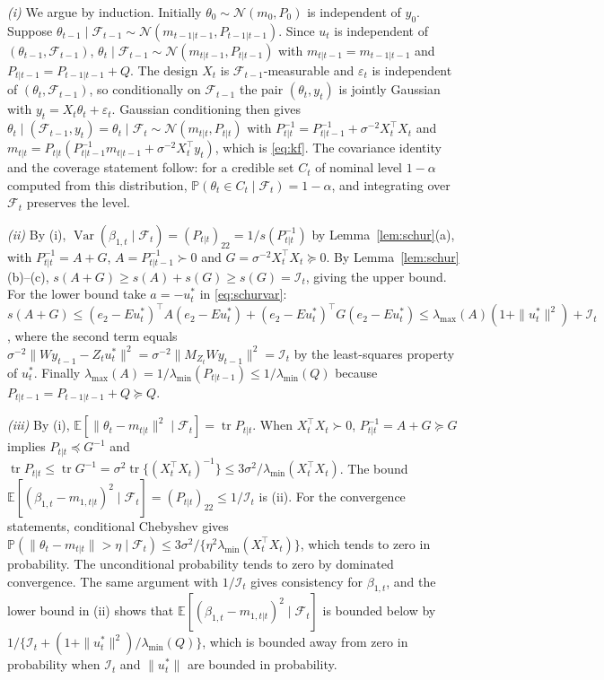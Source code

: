 \documentclass[12pt]{article}
\theoremstyle{plain}
\theoremstyle{definition}
\theoremstyle{remark}
\newcommand{\E}{\mathbb{E}}
\newcommand{\Prob}{\mathbb{P}}
\newcommand{\Var}{\operatorname{Var}}
\newcommand{\tr}{\operatorname{tr}}
\newcommand{\calF}{\mathcal{F}}
\newcommand{\calI}{\mathcal{I}}
\newcommand{\calN}{\mathcal{N}}
\newcommand{\T}{^{\top}}
\begin{document}
\emph{(i)} We argue by induction. Initially $\theta_0\sim\calN(m_0,P_0)$ is independent of $y_0$. Suppose $\theta_{t-1}\mid\calF_{t-1}\sim\calN(m_{t-1|t-1},P_{t-1|t-1})$. Since $u_t$ is independent of $(\theta_{t-1},\calF_{t-1})$, $\theta_t\mid\calF_{t-1}\sim\calN(m_{t|t-1},P_{t|t-1})$ with $m_{t|t-1}=m_{t-1|t-1}$ and $P_{t|t-1}=P_{t-1|t-1}+Q$. The design $X_t$ is $\calF_{t-1}$-measurable and $\varepsilon_t$ is independent of $(\theta_t,\calF_{t-1})$, so conditionally on $\calF_{t-1}$ the pair $(\theta_t,y_t)$ is jointly Gaussian with $y_t=X_t\theta_t+\varepsilon_t$. Gaussian conditioning then gives $\theta_t\mid(\calF_{t-1},y_t)=\theta_t\mid\calF_t\sim\calN(m_{t|t},P_{t|t})$ with $P_{t|t}^{-1}=P_{t|t-1}^{-1}+\sigma^{-2}X_t\T X_t$ and $m_{t|t}=P_{t|t}(P_{t|t-1}^{-1}m_{t|t-1}+\sigma^{-2}X_t\T y_t)$, which is \eqref{eq:kf}. The covariance identity and the coverage statement follow: for a credible set $C_t$ of nominal level $1-\alpha$ computed from this distribution, $\Prob(\theta_t\in C_t\mid\calF_t)=1-\alpha$, and integrating over $\calF_t$ preserves the level.

\emph{(ii)} By (i), $\Var(\beta_{1,t}\mid\calF_t)=(P_{t|t})_{22}=1/s(P_{t|t}^{-1})$ by Lemma~\ref{lem:schur}(a), with $P_{t|t}^{-1}=A+G$, $A=P_{t|t-1}^{-1}\succ0$ and $G=\sigma^{-2}X_t\T X_t\succeq0$. By Lemma~\ref{lem:schur}(b)--(c), $s(A+G)\ge s(A)+s(G)\ge s(G)=\calI_t$, giving the upper bound. For the lower bound take $a=-u_t^*$ in \eqref{eq:schurvar}: $s(A+G)\le(e_2-Eu_t^*)\T A(e_2-Eu_t^*)+(e_2-Eu_t^*)\T G(e_2-Eu_t^*)\le\lambda_{\max}(A)(1+\|u_t^*\|^2)+\calI_t$, where the second term equals $\sigma^{-2}\|Wy_{t-1}-Z_tu_t^*\|^2=\sigma^{-2}\|M_{Z_t}Wy_{t-1}\|^2=\calI_t$ by the least-squares property of $u_t^*$. Finally $\lambda_{\max}(A)=1/\lambda_{\min}(P_{t|t-1})\le1/\lambda_{\min}(Q)$ because $P_{t|t-1}=P_{t-1|t-1}+Q\succeq Q$.

\emph{(iii)} By (i), $\E[\|\theta_t-m_{t|t}\|^2\mid\calF_t]=\tr P_{t|t}$. When $X_t\T X_t\succ0$, $P_{t|t}^{-1}=A+G\succeq G$ implies $P_{t|t}\preceq G^{-1}$ and $\tr P_{t|t}\le\tr G^{-1}=\sigma^2\tr\{(X_t\T X_t)^{-1}\}\le3\sigma^2/\lambda_{\min}(X_t\T X_t)$. The bound $\E[(\beta_{1,t}-m_{1,t|t})^2\mid\calF_t]=(P_{t|t})_{22}\le1/\calI_t$ is (ii). For the convergence statements, conditional Chebyshev gives $\Prob(\|\theta_t-m_{t|t}\|>\eta\mid\calF_t)\le3\sigma^2/\{\eta^2\lambda_{\min}(X_t\T X_t)\}$, which tends to zero in probability. The unconditional probability tends to zero by dominated convergence. The same argument with $1/\calI_t$ gives consistency for $\beta_{1,t}$, and the lower bound in (ii) shows that $\E[(\beta_{1,t}-m_{1,t|t})^2\mid\calF_t]$ is bounded below by $1/\{\calI_t+(1+\|u_t^*\|^2)/\lambda_{\min}(Q)\}$, which is bounded away from zero in probability when $\calI_t$ and $\|u_t^*\|$ are bounded in probability.
\end{document}
